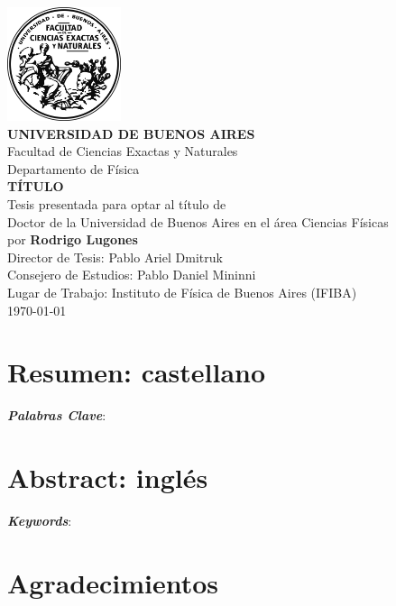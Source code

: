 \documentclass[12pt]{book}
\begin{document}
\frontmatter
\thispagestyle{empty}
\begin{center}
\large{
\includegraphics[width=0.25\textwidth]{logo.png}\vspace{1cm}\\
\textbf{UNIVERSIDAD DE BUENOS AIRES}\\
Facultad de Ciencias Exactas y Naturales\\
Departamento de Física\vspace{1.5cm}\\
\textbf{\LARGE TÍTULO}
\vspace{0.5cm}\\
Tesis presentada para optar al título de \\
Doctor de la Universidad de Buenos Aires en el área Ciencias Físicas\\
por \textbf{Rodrigo Lugones} \vspace{1.5cm}\\
Director de Tesis: Pablo Ariel Dmitruk\\
Consejero de Estudios: Pablo Daniel Mininni\\
Lugar de Trabajo: Instituto de Física de Buenos Aires (IFIBA)
\vspace{1.5cm}\\
\today
}
\end{center}

\newpage

\section*{Resumen: castellano}

\emph{\textbf{Palabras Clave}}: 
\newpage
\section*{Abstract: inglés}

\emph{\textbf{Keywords}}: 

\newpage

\section*{Agradecimientos}

\end{document}
